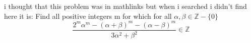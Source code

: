 i thought that this problem was in mathlinks but when i searched i didn't find  here it is:
Find all positive integers m for which for all $\alpha,\beta \in \mathbb{Z}-\{0\}$
\[ \frac{2^m \alpha^m-(\alpha+\beta)^m-(\alpha-\beta)^m}{3 \alpha^2+\beta^2} \in \mathbb{Z} \]